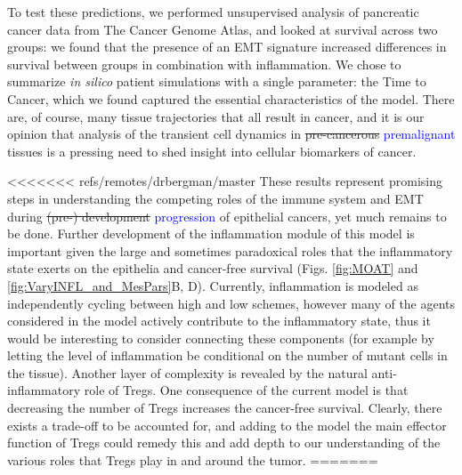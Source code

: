 \documentclass[11pt]{article}
\newcommand{\tcb} { \textcolor{blue} }
\begin{document}
\par
To test these predictions, we performed unsupervised analysis of pancreatic cancer data from The Cancer Genome Atlas, and looked at survival across two groups: we found that the presence of an EMT signature increased differences in survival between groups in combination with inflammation. We chose to summarize {\em in silico} patient simulations with a single parameter: the Time to Cancer, which we found captured the essential characteristics of the model. There are, of course, many tissue trajectories that all result in cancer, and it is our opinion that analysis of the transient cell dynamics in \sout{pre-cancerous} \tcb{premalignant} tissues is a pressing need to shed insight into cellular biomarkers of cancer.
\par
<<<<<<< refs/remotes/drbergman/master
These results represent promising steps in understanding the competing roles of the immune system and EMT during \sout{(pre-) development} \tcb{progression} of epithelial cancers, yet much remains to be done. Further development of the inflammation module of this model is important given the large and sometimes paradoxical roles that the inflammatory state exerts on the epithelia and cancer-free survival (Figs. \ref{fig:MOAT} and \ref{fig:VaryINFL_and_MesPars}B, D). Currently, inflammation is modeled as independently cycling between high and low schemes, however many of the agents considered in the model actively contribute to the inflammatory state, thus it would be interesting to consider connecting these components (for example by letting the level of inflammation be conditional on the number of mutant cells in the tissue). Another layer of complexity is revealed by the natural anti-inflammatory role of Tregs. One consequence of the current model is that decreasing the number of Tregs increases the cancer-free survival. Clearly, there exists a trade-off to be accounted for, and adding to the model the main effector function of Tregs could remedy this and add depth to our understanding of the various roles that Tregs play in and around the tumor.
=======
\end{document}
